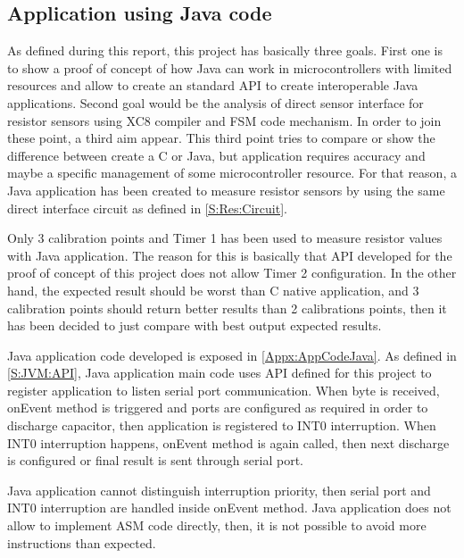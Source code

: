 \subsection{Application using Java code}\label{SS:Res:Code:Java}
As defined during this report, this project has basically three goals. First one is to show a proof of concept of how Java can work in microcontrollers with limited resources and allow to create an standard API to create interoperable Java applications. Second goal would be the analysis of direct sensor interface for resistor sensors using XC8 compiler and FSM code mechanism. In order to join these point, a third aim appear. This third point tries to compare or show the difference between create a C or Java, but application requires accuracy and maybe a specific management of some microcontroller resource. For that reason, a Java application has been created to measure resistor sensors by using the same direct interface circuit as defined in \ref{S:Res:Circuit}.

Only 3 calibration points and Timer 1 has been used to measure resistor values with Java application. The reason for this is basically that API developed for the proof of concept of this project does not allow Timer 2 configuration. In the other hand, the expected result should be worst than C native application, and 3 calibration points should return better results than 2 calibrations points, then it has been decided to just compare with best output expected results.

Java application code developed is exposed in \ref{Appx:AppCodeJava}. As defined in \ref{S:JVM:API}, Java application main code uses API defined for this project to register application to listen serial port communication. When byte is received, onEvent method is triggered and ports are configured as required in order to discharge capacitor, then application is registered to INT0 interruption. When INT0 interruption happens, onEvent method is again called, then next discharge is configured or final result is sent through serial port.

Java application cannot distinguish interruption priority, then serial port and INT0 interruption are handled inside onEvent method. Java application does not allow to implement ASM code directly, then, it is not possible to avoid more instructions than expected.